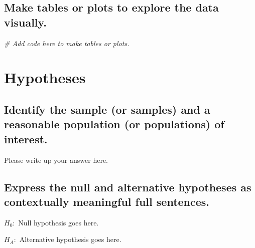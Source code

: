 \documentclass[
]{book}
\newenvironment{Shaded}{\begin{snugshade}}{\end{snugshade}}
\newcommand{\CommentTok}[1]{\textcolor[rgb]{0.56,0.35,0.01}{\textit{#1}}}
\begin{document}
\hypertarget{make-tables-or-plots-to-explore-the-data-visually.-2}{%
\subsection*{Make tables or plots to explore the data visually.}\label{make-tables-or-plots-to-explore-the-data-visually.-2}}

\begin{Shaded}
\begin{Highlighting}[]
\CommentTok{\# Add code here to make tables or plots.}
\end{Highlighting}
\end{Shaded}

\hypertarget{hypotheses-2}{%
\section*{Hypotheses}\label{hypotheses-2}}

\hypertarget{identify-the-sample-or-samples-and-a-reasonable-population-or-populations-of-interest.-2}{%
\subsection*{Identify the sample (or samples) and a reasonable population (or populations) of interest.}\label{identify-the-sample-or-samples-and-a-reasonable-population-or-populations-of-interest.-2}}

Please write up your answer here.

\hypertarget{express-the-null-and-alternative-hypotheses-as-contextually-meaningful-full-sentences.-2}{%
\subsection*{Express the null and alternative hypotheses as contextually meaningful full sentences.}\label{express-the-null-and-alternative-hypotheses-as-contextually-meaningful-full-sentences.-2}}

\(H_{0}:\) Null hypothesis goes here.

\(H_{A}:\) Alternative hypothesis goes here.
\end{document}
